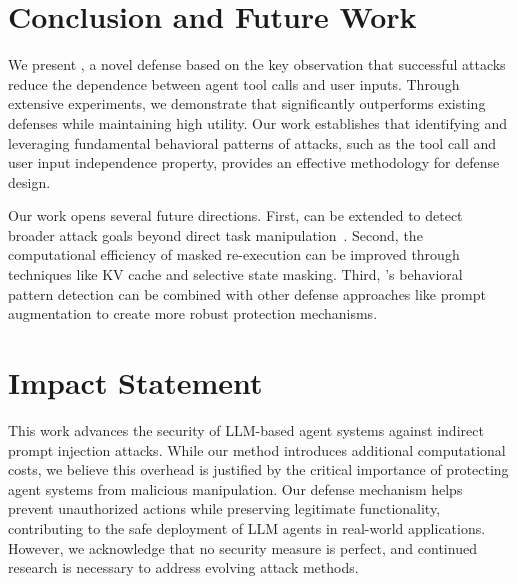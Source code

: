 \section{Conclusion and Future Work}
\label{sec:conclusion}

We present \method, a novel \ipi defense based on the key observation that successful attacks reduce the dependence between agent tool calls and user inputs. 
Through extensive experiments, we demonstrate that \method significantly outperforms existing defenses while maintaining high utility. Our work establishes that identifying and leveraging fundamental behavioral patterns of \ipi attacks, such as the tool call and user input independence property, provides an effective methodology for defense design.

Our work opens several future directions. 
First, \method can be extended to detect broader attack goals beyond direct task manipulation~\cite{wu2024agentattack}. 
Second, the computational efficiency of masked re-execution can be improved through techniques like KV cache and selective state masking. 
Third, \method's behavioral pattern detection can be combined with other defense approaches like prompt augmentation to create more robust protection mechanisms.



\section*{Impact Statement}
This work advances the security of LLM-based agent systems against indirect prompt injection attacks. While our method introduces additional computational costs, we believe this overhead is justified by the critical importance of protecting agent systems from malicious manipulation. Our defense mechanism helps prevent unauthorized actions while preserving legitimate functionality, contributing to the safe deployment of LLM agents in real-world applications. However, we acknowledge that no security measure is perfect, and continued research is necessary to address evolving attack methods.